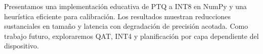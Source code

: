 Presentamos una implementación educativa de PTQ a INT8 en NumPy y una heurística eficiente para
calibración. Los resultados muestran reducciones sustanciales en tamaño y latencia con degradación
de precisión acotada. Como trabajo futuro, exploraremos QAT, INT4 y planificación por capa dependiente
del dispositivo.

